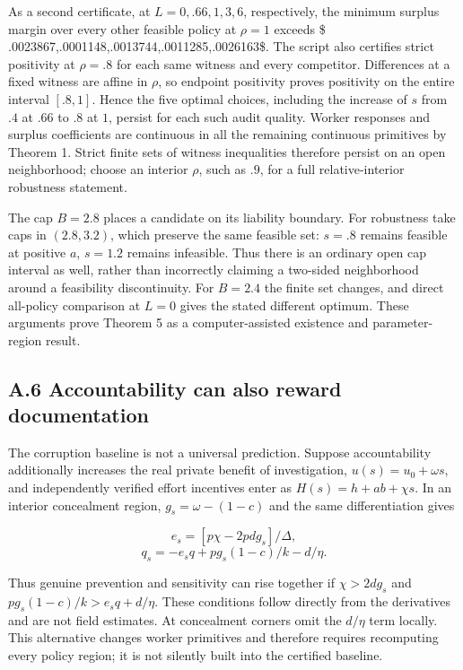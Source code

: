 \documentclass[
  11pt,
]{article}
\begin{document}
As a second certificate, at \(L=0,.66,1,3,6\), respectively, the minimum
surplus margin over every other feasible policy at \(\rho=1\) exceeds \$
.0023867,.0001148,.0013744,.0011285,.0026163\$. The script also
certifies strict positivity at \(\rho=.8\) for each same witness and
every competitor. Differences at a fixed witness are affine in \(\rho\),
so endpoint positivity proves positivity on the entire interval
\([.8,1]\). Hence the five optimal choices, including the increase of
\(s\) from \(.4\) at \(.66\) to \(.8\) at \(1\), persist for each such
audit quality. Worker responses and surplus coefficients are continuous
in all the remaining continuous primitives by Theorem 1. Strict finite
sets of witness inequalities therefore persist on an open neighborhood;
choose an interior \(\rho\), such as \(.9\), for a full
relative-interior robustness statement.

The cap \(B=2.8\) places a candidate on its liability boundary. For
robustness take caps in \((2.8,3.2)\), which preserve the same feasible
set: \(s=.8\) remains feasible at positive \(a\), \(s=1.2\) remains
infeasible. Thus there is an ordinary open cap interval as well, rather
than incorrectly claiming a two-sided neighborhood around a feasibility
discontinuity. For \(B=2.4\) the finite set changes, and direct
all-policy comparison at \(L=0\) gives the stated different optimum.
These arguments prove Theorem 5 as a computer-assisted existence and
parameter-region result.

\subsection{A.6 Accountability can also reward
documentation}\label{a.6-accountability-can-also-reward-documentation}

The corruption baseline is not a universal prediction. Suppose
accountability additionally increases the real private benefit of
investigation, \(u(s)=u_0+\omega s\), and independently verified effort
incentives enter as \(H(s)=h+ab+\chi s\). In an interior concealment
region, \(g_s=\omega-(1-c)\) and the same differentiation gives

\[e_s=[p\chi-2pdg_s]/\Delta,\] \[q_s=-e_sq+pg_s(1-c)/k-d/\eta.\]

Thus genuine prevention and sensitivity can rise together if
\(\chi>2dg_s\) and \(pg_s(1-c)/k>e_sq+d/\eta\). These conditions follow
directly from the derivatives and are not field estimates. At
concealment corners omit the \(d/\eta\) term locally. This alternative
changes worker primitives and therefore requires recomputing every
policy region; it is not silently built into the certified baseline.
\end{document}
